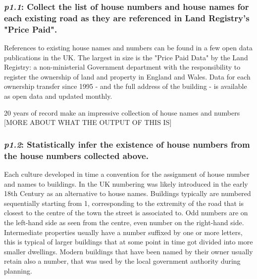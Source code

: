     \subsubsection{{\it p1.1}: Collect the list of house numbers and house names for each existing road as they are referenced in Land Registry's "Price Paid".} 

        References to existing house names and numbers can be found in a few open data publications in the UK. The largest in size is the "Price Paid Data" by the Land Registry: a non-ministerial Government department with the responsibility to register the ownership of land and property in England and Wales. Data for each ownership transfer since 1995 - and the full address of the building - is available as open data and updated monthly.
        
        20 years of record make an impressive collection of house names and numbers [MORE ABOUT WHAT THE OUTPUT OF THIS IS]

    \subsubsection{{\it p1.2}: Statistically infer the existence of house numbers from the house numbers collected above.} 

        Each culture developed in time a convention for the assignment of house number and names to buildings. In the UK numbering was likely introduced in the early 18th Century as an alternative to house names. Buildings typically are numbered sequentially starting from 1, corresponding to the extremity of the road that is closest to the centre of the town the street is associated to. Odd numbers are on the left-hand side as seen from the centre, even number on the right-hand side. Intermediate properties usually have a number suffixed by one or more letters, this is typical of larger buildings that at some point in time got divided into more smaller dwellings. Modern buildings that have been named by their owner usually retain also a number, that was used by the local government authority during planning.
        
